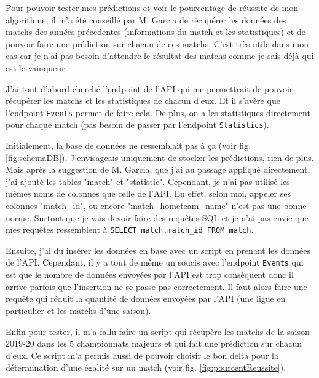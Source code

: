 \documentclass[a4paper,14pt]{extarticle}
\begin{document}
{Pour pouvoir tester mes prédictions et voir le pourcentage de réussite de mon algorithme, il m'a été conseillé par M. Garcia de récupérer les données des matchs des années précédentes (informations du match et les statistiques) et de pouvoir faire une prédiction sur chacun de ces matchs. C'est très utile dans mon cas car je n'ai pas besoin d'attendre le résultat des matchs comme je sais déjà qui est le vainqueur.

J'ai tout d'abord cherché l'endpoint de l'API qui me permettrait de pouvoir récupérer les matchs et les statistiques de chacun d'eux. Et il s'avère que l'endpoint \texttt{Events} permet de faire cela. De plus, on a les statistiques directement pour chaque match (pas besoin de passer par l'endpoint \texttt{Statistics}). 

Initialement, la base de données ne ressemblait pas à ça (voir fig. \ref{fig:schemaDB}). J'envisageais uniquement de stocker les prédictions, rien de plus. Mais après la suggestion de M. Garcia, que j'ai au passage appliqué directement, j'ai ajouté les tables "match" et "statistic". Cependant, je n'ai pas utilisé les mêmes noms de colonnes que celle de l'API. En effet, selon moi, appeler ses colonnes "match\_id", ou encore "match\_hometeam\_name" n'est pas une bonne norme. Surtout que je vais devoir faire des requêtes SQL et je n'ai pas envie que mes requêtes ressemblent à \texttt{SELECT match.match\_id FROM match}.

Ensuite, j'ai du insérer les données en base avec un script en prenant les données de l'API. Cependant, il y a tout de même un soucis avec l'endpoint \texttt{Events} qui est que le nombre de données envoyées par l'API est trop conséquent donc il arrive parfois que l'insertion ne se passe pas correctement. Il faut alors faire une requête qui réduit la quantité de données envoyées par l'API (une ligue en particulier et les matchs d'une saison). 

Enfin pour tester, il m'a fallu faire un script qui récupère les matchs de la saison 2019-20 dans les 5 championnats majeurs et qui fait une prédiction sur chacun d'eux. Ce script m'a permis aussi de pouvoir choisir le bon delta pour la détermination d'une égalité sur un match (voir fig. \ref{fig:pourcentReussite}). 

}
\end{document}
